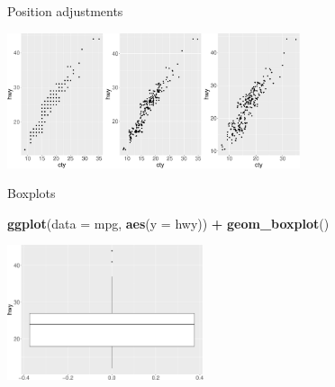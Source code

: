 \documentclass[ignorenonframetext,]{beamer}
\newenvironment{Shaded}{\begin{snugshade}}{\end{snugshade}}
\newcommand{\DataTypeTok}[1]{\textcolor[rgb]{0.13,0.29,0.53}{#1}}
\newcommand{\KeywordTok}[1]{\textcolor[rgb]{0.13,0.29,0.53}{\textbf{#1}}}
\newcommand{\NormalTok}[1]{#1}
\newcommand{\OperatorTok}[1]{\textcolor[rgb]{0.81,0.36,0.00}{\textbf{#1}}}
\newcommand{\StringTok}[1]{\textcolor[rgb]{0.31,0.60,0.02}{#1}}
\begin{document}
\begin{frame}{Position adjustments}
\protect\hypertarget{position-adjustments-13}{}

\begin{center}\includegraphics[height=150px]{data-visualization_files/figure-beamer/unnamed-chunk-135-1} \end{center}

\end{frame}

\begin{frame}[fragile]{Boxplots}
\protect\hypertarget{boxplots}{}

\begin{Shaded}
\begin{Highlighting}[]
\KeywordTok{ggplot}\NormalTok{(}\DataTypeTok{data =}\NormalTok{ mpg, }\KeywordTok{aes}\NormalTok{(}\DataTypeTok{y =}\NormalTok{ hwy)) }\OperatorTok{+}\StringTok{ }
\StringTok{  }\KeywordTok{geom_boxplot}\NormalTok{()}
\end{Highlighting}
\end{Shaded}

\begin{center}\includegraphics[height=150px]{data-visualization_files/figure-beamer/unnamed-chunk-136-1} \end{center}

\end{frame}
\end{document}
